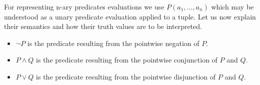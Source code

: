 \documentclass[runningheads]{llncs}
\newcommand{\SP}{\;\;\;}
\newcommand{\TAnd}{\textit{And}}
\newcommand{\TNot}{\textit{Not}}
\newcommand{\TTV}{\textit{TV}}
\newcommand{\TBTV}{\langle \TTV \rangle}
\newcommand{\prob}{\mathcal{Pr}}
\begin{document}
For representing n-ary predicates evaluations we use
$P(a_1, \dots, a_n)$ which may be understood as a unary predicate
evaluation applied to a tuple.  Let us now explain their semantics and
how their truth values are to be interpreted.
\begin{itemize}
\item $\lnot P$ is the predicate resulting from the pointwise negation
  of $P$.
\item
  $P \land Q$ is the predicate resulting from the pointwise
  conjunction of $P$ and $Q$.
\item
  $P \lor Q$ is the predicate resulting from the pointwise disjunction
  of $P$ and $Q$.

\end{itemize}
\end{document}
